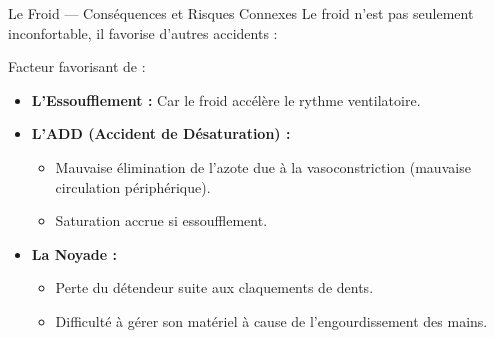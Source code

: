 \begin{frame}{Le Froid — Conséquences et Risques Connexes}
    Le froid n'est pas seulement inconfortable, il favorise d'autres accidents :
    
    \begin{alertblock}{Facteur favorisant de :}
        \begin{itemize}
            \item \textbf{L'Essoufflement :} Car le froid accélère le rythme ventilatoire.
            \item \textbf{L'ADD (Accident de Désaturation) :} 
                \begin{itemize}
                    \item Mauvaise élimination de l'azote due à la vasoconstriction (mauvaise circulation périphérique).
                    \item Saturation accrue si essoufflement.
                \end{itemize}
            \item \textbf{La Noyade :}
                \begin{itemize}
                    \item Perte du détendeur suite aux claquements de dents.
                    \item Difficulté à gérer son matériel à cause de l'engourdissement des mains.
                \end{itemize}
        \end{itemize}
    \end{alertblock}
\end{frame}


